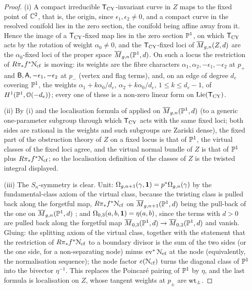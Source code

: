 \begin{proof}
(i) A compact irreducible $\mathsf{T}_{\mathrm{CY}}$-invariant curve in $Z$ maps to the fixed point of $\mathbb{C}^2$, that is, the origin, since $\epsilon_1,\epsilon_2\neq 0$, and a compact curve in the resolved conifold lies in the zero section, the conifold being affine away from it. Hence the image of a $\mathsf{T}_{\mathrm{CY}}$-fixed map lies in the zero section $\mathbb{P}^1$, on which $\mathsf{T}_{\mathrm{CY}}$ acts by the rotation of weight $\alpha_0\neq 0$, and the $\mathsf{T}_{\mathrm{CY}}$-fixed loci of $\overline{M}_{g,n}(Z,d)$ are the $\alpha_0$-fixed loci of the proper space $\overline{M}_{g,n}(\mathbb{P}^1,d)$. On such a locus the restriction of $R\pi_*f^*\mathcal{N}_{\mathrm{cf}}$ is moving: its weights are the fibre characters $\alpha_1,\alpha_2,-\epsilon_1,-\epsilon_2$ at $p_+$ and $\mathsf{B},\mathsf{A},-\epsilon_1,-\epsilon_2$ at $p_-$ (vertex and flag terms), and, on an edge of degree $d_e$ covering $\mathbb{P}^1$, the weights $\alpha_1+k\alpha_0/d_e$, $\alpha_2+k\alpha_0/d_e$, $1\leq k\leq d_e-1$, of $H^1(\mathbb{P}^1,\mathcal{O}(-d_e))$; every one of these is a non-zero linear form on $\mathrm{Lie}(\mathsf{T}_{\mathrm{CY}})$. 

(ii) By (i) and the localisation formula of \cite{GP99} applied on $\overline{M}_{g,n}(\mathbb{P}^1,d)$ (to a generic one-parameter subgroup through which $\mathsf{T}_{\mathrm{CY}}$ acts with the same fixed loci; both sides are rational in the weights and such subgroups are Zariski dense), the fixed part of the obstruction theory of $Z$ on a fixed locus is that of $\mathbb{P}^1$, the virtual classes of the fixed loci agree, and the virtual normal bundle of $Z$ is that of $\mathbb{P}^1$ plus $R\pi_*f^*\mathcal{N}_{\mathrm{cf}}$; so the localisation definition of the classes of $Z$ is the twisted integral displayed. 

(iii) The $S_n$-symmetry is clear. Unit: $\Omega_{g,n+1}(\gamma,\mathbf{1})=p^*\Omega_{g,n}(\gamma)$ by the fundamental-class axiom of the virtual class, because the twisting class is pulled back along the forgetful map, $R\pi_*f^*\mathcal{N}_{\mathrm{cf}}$ on $\overline{M}_{g,n+1}(\mathbb{P}^1,d)$ being the pull-back of the one on $\overline{M}_{g,n}(\mathbb{P}^1,d)$ \cite[App.~1~(iv)]{CG07}; and $\Omega_{0,3}(a,b,\mathbf{1})=\eta(a,b)$, since the terms with $d>0$ are pulled back along the forgetful map $\overline{M}_{0,3}(\mathbb{P}^1,d)\to\overline{M}_{0,2}(\mathbb{P}^1,d)$ and vanish. Gluing: the splitting axiom of the virtual class, together with the statement that the restriction of $R\pi_*f^*\mathcal{N}_{\mathrm{cf}}$ to a boundary divisor is the sum of the two sides (or the one side, for a non-separating node) minus $\operatorname{ev}^*\mathcal{N}_{\mathrm{cf}}$ at the node \cite[App.~1~(v), (vi)]{CG07} (equivalently, the normalisation sequence); the node factor $e(\mathcal{N}_{\mathrm{cf}})$ turns the diagonal class of $\mathbb{P}^1$ into the bivector $\eta^{-1}$. This replaces the Poincar\'e pairing of $\mathbb{P}^1$ by $\eta$, and the last formula is localisation on $Z$, whose tangent weights at $p_\pm$ are $\mathrm{wt}_\pm$. 
\end{proof}


